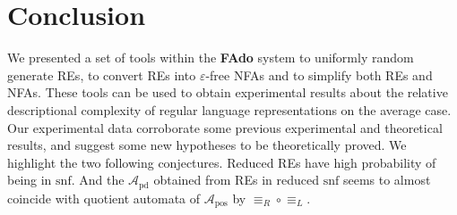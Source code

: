 \documentclass{llncs}
\newcommand{\FAdo}{{\bf FAdo}\xspace}
\newcommand{\nfas}{NFAs\xspace}
\newcommand{\res}{REs\xspace}
\newcommand{\snf}{\mbox{$\mathrm{snf}$}\xspace}
\newcommand{\nfa}{\mathcal{A}}
\newcommand{\pos}{{\mathrm{pos}}}
\newcommand{\pd}{{\mathrm{pd}}}
\let\epsilon=\varepsilon
\begin{document}
\section{Conclusion}

We presented a set of tools within the \FAdo system to uniformly random
generate \res, to convert \res into $\epsilon$-free \nfas and to 
simplify both \res and \nfas.  These tools can be
used to obtain experimental results about the relative descriptional
complexity of regular language representations on the average
case. Our experimental data corroborate some previous experimental and
theoretical results, and suggest some new hypotheses to be
theoretically proved. We highlight the two following
conjectures. Reduced \res have high probability of being
in \snf. And the $\nfa_\pd$ obtained from \res in reduced \snf seems to almost coincide
with quotient automata of $\nfa_\pos$ by $\equiv_R\circ \equiv_L$.
\medskip
\end{document}
